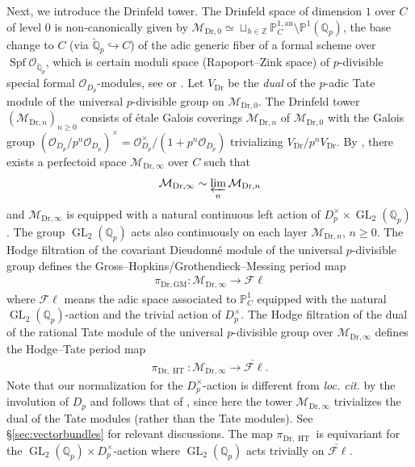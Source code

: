 \documentclass{article}
\theoremstyle{definition}
\def\calM{\mathcal{M}}
\def\calO{\mathcal{O}}
\def\bbP{\mathbb{P}}
\def\bbQ{\mathbb{Q}}
\def\bbZ{\mathbb{Z}}
\newcommand{\ilim}{\varprojlim}
\DeclareMathOperator{\GL}{GL}
\DeclareMathOperator{\HT}{HT}
\DeclareMathOperator{\Spf}{Spf}
\def\fl{\mathscr{F}\ell}
\def\GM{\mathrm{GM}}
\def\Dr{\mathrm{Dr}}
\begin{document}
Next, we introduce the Drinfeld tower. The Drinfeld space of dimension $1$ over $C$ of level $0$ is non-canonically given by $\calM_{\Dr,0}\simeq \sqcup_{h\in\bbZ}\bbP^{1,\mathrm{an}}_{C}\setminus \bbP^1(\bbQ_p)$, the base change to $C$ (via $\breve{\bbQ}_p\hookrightarrow C$) of the adic generic fiber of a formal scheme over $\Spf \calO_{\breve{\bbQ}_p}$, which is certain moduli space (Rapoport--Zink space) of $p$-divisible special formal $\calO_{D_p}$-modules, see \cite{Dr76} or \cite[Theorem. 3.72]{RZ96}. Let $V_{\Dr}$ be the \textit{dual} of the $p$-adic Tate module of the universal $p$-divisible group on $\calM_{\Dr,0}$. The Drinfeld tower $(\calM_{\Dr,n})_{n\geq 0}$ consists of \'etale Galois coverings $\calM_{\Dr,n}$ of $\calM_{\Dr,0}$ with the Galois group $(\calO_{D_p}/p^n\calO_{D_p})^\times=\calO_{D_p}^\times/(1+p^n\calO_{D_p})$ trivializing $V_{\Dr}/p^n V_{\Dr}$. By \cite[Theorem 6.5.4]{SW13}, there exists a perfectoid space $\calM_{\Dr,\infty}$ over $C$ such that 
\begin{align*}
    \calM_{\Dr,\infty}\sim\ilim_n\calM_{\Dr,n}
\end{align*}
and $\calM_{\Dr,\infty}$ is equipped with a natural continuous left action of $D_p^{\times}\times \GL_2(\bbQ_p)$. The group $\GL_2(\bbQ_p)$ acts also continuously on each layer $\calM_{\Dr,n}$, $n\ge 0$. The Hodge filtration of the covariant Dieudonn\'e module of the universal $p$-divisible group defines the Gross--Hopkins/Grothendieck--Messing period map \cite[Prop. 6.5.5]{SW13}
\begin{align*}
    \pi_{\Dr,\GM}:\calM_{\Dr,\infty}\to {\fl}
\end{align*}
where $\fl$ means the adic space associated to $\bbP^1_C$ equipped with the natural $\GL_2(\bbQ_p)$-action and the trivial action of $D_p^{\times}$. The Hodge filtration of the dual of the rational Tate module of the universal $p$-divisible group over $\calM_{\Dr,\infty}$ defines the Hodge--Tate period map \cite[Prop. 7.1.1]{SW13}
\begin{align*}
    \pi_{\Dr,\HT}:\calM_{\Dr,\infty}\to \check{\fl}.
\end{align*}
Note that our normalization for the $D_p^{\times}$-action is different from \textit{loc. cit.} by the involution of $D_p$ and follows that of \cite{PanII}, since here the tower $\calM_{\Dr,\infty}$ trivializes the dual of the Tate modules (rather than the Tate modules). See \S\ref{sec:vectorbundles} for relevant discussions. The map $\pi_{\Dr,\HT}$ is equivariant for the $\GL_2(\bbQ_p)\times D_p^\times$-action where $\GL_2(\bbQ_p)$ acts trivially on $\check{\fl}$.
\end{document}
